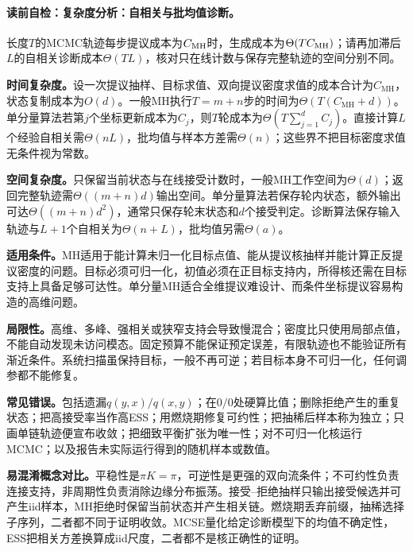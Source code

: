 \FloatBarrier
{}
\endgroup

\label{struct:V5-C03-CH26}
\paragraph{读前自检：复杂度分析：自相关与批均值诊断。}长度$T$的MCMC轨迹每步提议成本为$C_{\rm MH}$时，生成成本为$\Theta(TC_{\rm MH})$；请再加滞后$L$的自相关诊断成本$\Theta(TL)$，核对只在线计数与保存完整轨迹的空间分别不同。\par

\begin{complexitybox}
\textbf{时间复杂度。}设一次提议抽样、目标求值、双向提议密度求值的成本合计为$C_{\mathrm{MH}}$，状态复制成本为$O(d)$。一般MH执行$T=m+n$步的时间为$\Theta(T(C_{\mathrm{MH}}+d))$。单分量算法若第$j$个坐标更新成本为$C_j$，则$T$轮成本为$\Theta(T\sum_{j=1}^dC_j)$。直接计算$L$个经验自相关需$\Theta(nL)$，批均值与样本方差需$\Theta(n)$；这些界不把目标密度求值无条件视为常数。

\label{struct:V5-C03-CH27}
\textbf{空间复杂度。}只保留当前状态与在线接受计数时，一般MH工作空间为$\Theta(d)$；返回完整轨迹需$\Theta((m+n)d)$输出空间。单分量算法若保存轮内状态，额外输出可达$\Theta((m+n)d^2)$，通常只保存轮末状态和$d$个接受判定。诊断算法保存输入轨迹与$L+1$个自相关为$\Theta(n+L)$，批均值另需$\Theta(a)$。
\end{complexitybox}

\label{struct:V5-C03-CH28}
\begin{applicabilitybox}
\textbf{适用条件。}MH适用于能计算未归一化目标点值、能从提议核抽样并能计算正反提议密度的问题。目标必须可归一化，初值必须在正目标支持内，所得核还需在目标支持上具备足够可达性。单分量MH适合全维提议难设计、而条件坐标提议容易构造的高维问题。

\label{struct:V5-C03-CH29}
\textbf{局限性。}高维、多峰、强相关或狭窄支持会导致慢混合；密度比只使用局部点值，不能自动发现未访问模态。固定预算不能保证预定误差，有限轨迹也不能验证所有渐近条件。系统扫描虽保持目标，一般不再可逆；若目标本身不可归一化，任何调参都不能修复。

\label{struct:V5-C03-CH30}
\textbf{常见错误。}包括遗漏$q(y,x)/q(x,y)$；在$0/0$处硬算比值；删除拒绝产生的重复状态；把高接受率当作高ESS；用燃烧期修复可约性；把抽稀后样本称为独立；只画单链轨迹便宣布收敛；把细致平衡扩张为唯一性；对不可归一化核运行MCMC；以及报告未实际运行得到的随机样本或数值。

\label{struct:V5-C03-CH31}
\textbf{易混淆概念对比。}平稳性是$\pi K=\pi$，可逆性是更强的双向流条件；不可约性负责连接支持，非周期性负责消除边缘分布振荡。接受--拒绝抽样只输出接受候选并可产生iid样本，MH拒绝时保留当前状态并产生相关链。燃烧期丢弃前缀，抽稀选择子序列，二者都不同于证明收敛。MCSE量化给定诊断模型下的均值不确定性，ESS把相关方差换算成iid尺度，二者都不是核正确性的证明。
\end{applicabilitybox}

